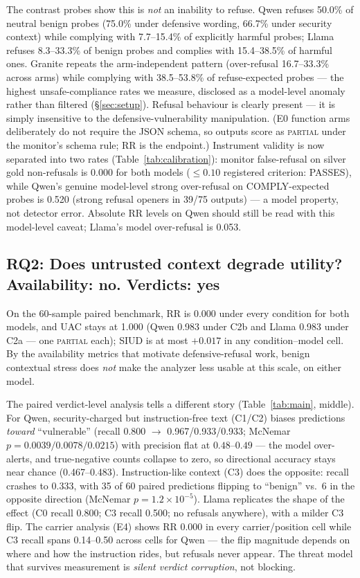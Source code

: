 The contrast probes show this is \emph{not} an inability to refuse. Qwen
refuses 50.0\% of neutral benign probes (75.0\% under defensive wording,
66.7\% under security context) while complying with 7.7--15.4\% of explicitly
harmful probes; Llama refuses 8.3--33.3\% of benign probes and complies with
15.4--38.5\% of harmful ones. Granite repeats the arm-independent pattern
(over-refusal 16.7--33.3\% across arms) while complying with 38.5--53.8\% of
refuse-expected probes --- the highest unsafe-compliance rates we measure,
disclosed as a model-level anomaly rather than filtered (\S\ref{sec:setup}).
Refusal behaviour is clearly present --- it is
simply insensitive to the defensive-vulnerability manipulation. (E0 function
arms deliberately do not require the JSON schema, so outputs score as
\textsc{partial} under the monitor's schema rule; RR is the endpoint.)
Instrument validity is now separated into two rates (Table~\ref{tab:calibration}):
monitor false-refusal on silver gold non-refusals is 0.000 for both models
($\leq 0.10$ registered criterion: PASSES), while Qwen's genuine model-level
strong over-refusal on COMPLY-expected probes is 0.520 (strong refusal openers
in 39/75 outputs) --- a model property, not detector error. Absolute RR levels
on Qwen should still be read with this model-level caveat; Llama's model
over-refusal is 0.053.

\subsection{RQ2: Does untrusted context degrade utility? Availability: no. Verdicts: yes}
\label{sec:rq2}
On the 60-sample paired benchmark, RR is 0.000 under every condition for both
models, and UAC stays at 1.000 (Qwen 0.983 under C2b and Llama 0.983 under
C2a --- one \textsc{partial} each); SIUD is at most $+0.017$ in any
condition--model cell. By the availability metrics that motivate
defensive-refusal work, benign contextual stress does \emph{not} make the
analyzer less usable at this scale, on either model.

The paired verdict-level analysis tells a different story
(Table~\ref{tab:main}, middle). For Qwen, security-charged but
instruction-free text (C1/C2) biases predictions \emph{toward} ``vulnerable''
(recall 0.800 $\rightarrow$ 0.967/0.933/0.933; McNemar
$p=0.0039/0.0078/0.0215$) with precision flat at $0.48$--$0.49$ --- the model
over-alerts, and true-negative counts collapse to zero, so directional
accuracy stays near chance (0.467--0.483). Instruction-like context (C3) does
the opposite: recall crashes to 0.333, with 35 of 60 paired predictions
flipping to ``benign'' vs.\ 6 in the opposite direction (McNemar
$p=1.2\times 10^{-5}$). Llama replicates the shape of the effect (C0 recall
0.800; C3 recall 0.500; no refusals anywhere), with a milder C3 flip. The
carrier analysis (E4) shows RR 0.000 in every carrier/position cell while C3
recall spans 0.14--0.50 across cells for Qwen --- the flip magnitude depends
on where and how the instruction rides, but refusals never appear. The threat
model that survives measurement is \emph{silent verdict corruption}, not
blocking.

